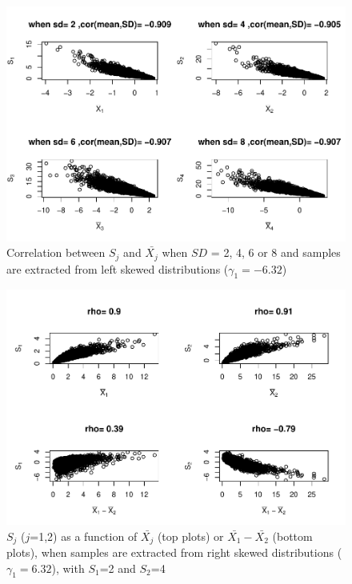 \documentclass[
  english,
  man,mask,floatsintext]{apa6}
\begin{document}
\begin{figure}
\centering
\includegraphics{Correlation_files/figure-latex/Hetbalcorasafctofn2-1.pdf}
\caption{\label{fig:Hetbalcorasafctofn2}Correlation between \(S_j\) and \(\bar{X_j}\) when \(SD\) = 2, 4, 6 or 8 and samples are extracted from left skewed distributions (\(\gamma_1 = -6.32\))}
\end{figure}

\begin{figure}
\centering
\includegraphics{Correlation_files/figure-latex/pltSDHetbalRskew-1.pdf}
\caption{\label{fig:pltSDHetbalRskew}\(S_j\) (\(j\)=1,2) as a function of \(\bar{X_j}\) (top plots) or \(\bar{X_1}-\bar{X_2}\) (bottom plots), when samples are extracted from right skewed distributions (\(\gamma_1 = 6.32\)), with \(S_1\)=2 and \(S_2\)=4}
\end{figure}
\end{document}
